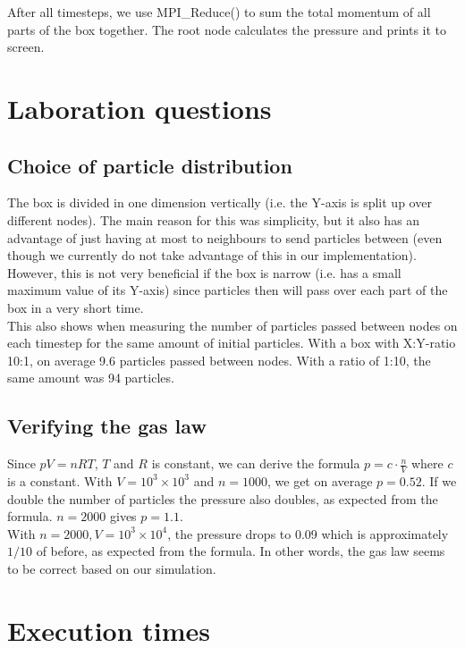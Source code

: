 \documentclass[a4paper]{article}
\begin{document}
After all timesteps, we use MPI\_Reduce() to sum the total momentum of
all parts of the box together. The root node calculates the pressure and
prints it to screen.

\section{Laboration questions}

\subsection{Choice of particle distribution} The box is divided in one
dimension vertically (i.e. the Y-axis is split up over different nodes).
The main reason for this was simplicity, but it also has an advantage of
just having at most to neighbours to send particles between (even
though we currently do not take advantage of this in our
implementation).\\

However, this is not very beneficial if the box is narrow (i.e. has a
small maximum value of its Y-axis) since particles then will pass over
each part of the box in a very short time.\\

This also shows when measuring the number of particles passed between
nodes on each timestep for the same amount of initial particles. With a
box with X:Y-ratio 10:1, on average 9.6 particles passed between nodes.
With a ratio of 1:10, the same amount was 94 particles.\\


\subsection{Verifying the gas law}

Since $pV = nRT$, $T$ and $R$ is constant, we can derive the formula
$p=c\cdot\frac{n}{V}$ where $c$ is a constant. With $V=10^{3} \times
10^{3}$ and $n=1000$, we get on average $p=0.52$. If we double the
number of particles the pressure also doubles, as expected from the
formula. $n=2000$ gives $p=1.1$.\\

With $n=2000, V=10^{3} \times 10^{4}$, the pressure drops to 0.09 which
is approximately $1/10$ of before, as expected from the formula. In
other words, the gas law seems to be correct based on our simulation.\\

\section{Execution times}
\end{document}

